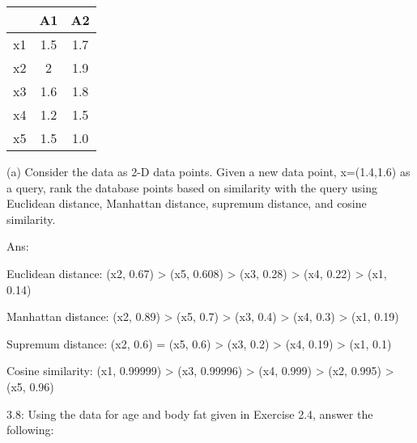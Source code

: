 	\vspace{0.5\baselineskip}

	\begin{center}
	\begin{tabular}{||c c c||} 
	\hline
	  & A1 & A2 \\ [0.5ex] 
	\hline\hline
	x1 & 1.5 & 1.7 \\ 
	\hline
	x2 & 2 & 1.9 \\
	\hline
	x3 & 1.6 & 1.8 \\
	\hline
	x4 & 1.2 & 1.5 \\
	\hline
	x5 & 1.5 & 1.0 \\ [1ex] 
	\hline
	\end{tabular}
	\end{center}

	\begin{description}
		\item (a) Consider the data as 2-D data points. Given a new data point, x=(1.4,1.6) as a query,
		rank the database points based on similarity with the query using Euclidean distance,
		Manhattan distance, supremum distance, and cosine similarity.

		\vspace{0.5\baselineskip}

		Ans:

		\begin{description}

			\item Euclidean distance: (x2, 0.67) > (x5, 0.608) > (x3, 0.28) > (x4, 0.22) > (x1, 0.14)
			\vspace{0.5\baselineskip}
			\item Manhattan distance: (x2, 0.89) > (x5, 0.7) > (x3, 0.4) > (x4, 0.3) > (x1, 0.19)
			\vspace{0.5\baselineskip}
			\item Supremum distance: (x2, 0.6) = (x5, 0.6) > (x3, 0.2) > (x4, 0.19) > (x1, 0.1)
			\vspace{0.5\baselineskip}
			\item Cosine similarity: (x1, 0.99999) > (x3, 0.99996) > (x4, 0.999) > (x2, 0.995) > (x5, 0.96)
			
		\end{description}

	\end{description}

	\clearpage
	
	3.8: Using the data for age and body fat given in Exercise 2.4, answer the following:

